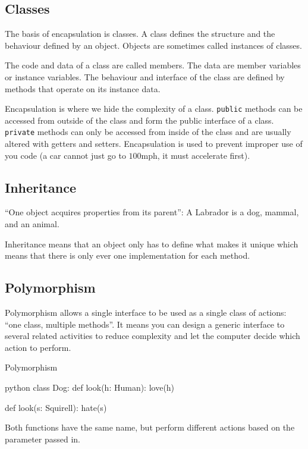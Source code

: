 \subsection{Classes}\label{sub:classes}

The basis of encapsulation is classes.
A class defines the structure and the behaviour defined by an object.
Objects are sometimes called instances of classes.

The code and data of a class are called members.
The data are member variables or instance variables.
The behaviour and interface of the class are defined by methods that operate on its instance data.

Encapsulation is where we hide the complexity of a class.
\texttt{public} methods can be accessed from outside of the class and form the public interface of a class.
\texttt{private} methods can only be accessed from inside of the class and are usually altered with getters and setters.
Encapsulation is used to prevent improper use of you code (a car cannot just go to \(100\)mph, it must accelerate first).

\subsection{Inheritance}\label{sub:inheritance}

``One object acquires properties from its parent'': A Labrador is a dog, mammal, and an animal.

Inheritance means that an object only has to define what makes it unique which means that there is only ever one implementation for each method.

\subsection{Polymorphism}\label{sub:polymorphism}

Polymorphism allows a single interface to be used as a single class of actions: ``one class, multiple methods''.
It means you can design a generic interface to several related activities to reduce complexity and let the computer decide which action to perform.
%
\begin{highlight}{Polymorphism}
	\begin{code}{python}
		class Dog:
            def look(h: Human):
                love(h)

            def look(s: Squirell):
                hate(s)
	\end{code}
\end{highlight}
%
Both functions have the same name, but perform different actions based on the parameter passed in.
